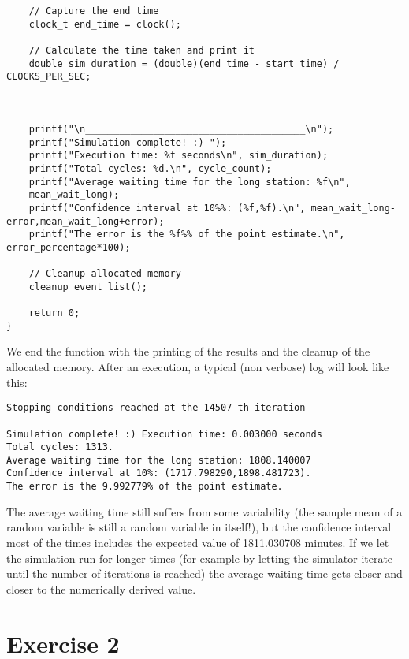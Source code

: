\documentclass[12pt]{article}
\begin{document}
\begin{lstlisting}
	// Capture the end time
	clock_t end_time = clock();
	
	// Calculate the time taken and print it
	double sim_duration = (double)(end_time - start_time) / CLOCKS_PER_SEC;
	
	
	
	printf("\n_______________________________________\n");
	printf("Simulation complete! :) ");
	printf("Execution time: %f seconds\n", sim_duration);
	printf("Total cycles: %d.\n", cycle_count);
	printf("Average waiting time for the long station: %f\n",
	mean_wait_long);
	printf("Confidence interval at 10%%: (%f,%f).\n", mean_wait_long-error,mean_wait_long+error);
	printf("The error is the %f%% of the point estimate.\n", error_percentage*100);
	
	// Cleanup allocated memory
	cleanup_event_list();
	
	return 0;
}
\end{lstlisting}
We end the function with the printing of the results and the cleanup of the allocated memory. After an execution, a typical (non verbose) log will look like this:
\begin{verbatim}
Stopping conditions reached at the 14507-th iteration
_______________________________________
Simulation complete! :) Execution time: 0.003000 seconds
Total cycles: 1313.
Average waiting time for the long station: 1808.140007
Confidence interval at 10%: (1717.798290,1898.481723).
The error is the 9.992779% of the point estimate.
\end{verbatim}
The average waiting time still suffers from some variability (the sample mean of a random variable is still a random variable in itself!), but the confidence interval most of the times includes the expected value of 1811.030708 minutes. If we let the simulation run for longer times (for example by letting the simulator iterate until the  number of iterations is reached) the average waiting time gets closer and closer to the numerically derived value.
\section{Exercise 2}
\end{document}
